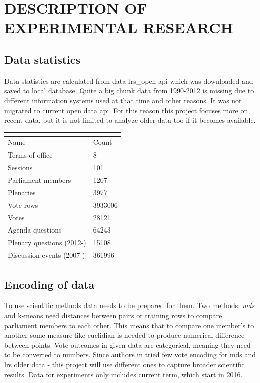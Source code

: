 \documentclass[a4paper,12pt]{article}
\begin{document}
 	
	\clearpage
	
	\section{DESCRIPTION OF EXPERIMENTAL RESEARCH}
	\subsection{Data statistics}
	
	Data statistics are calculated from data \gls{lrs_open} \acrshort{api} which was downloaded and saved to local database. Quite a big chunk data from 1990-2012 is missing due to different information systems used at that time and other reasons. It was not migrated to current open data \acrshort{api}. For this reason this project focuses more on recent data, but it is not limited to analyze older data too if it becomes available.
	
	\noindent
	\begin{center}
		\begin{tabular}{L{5cm} R{3cm}}
			\\ 
			\hline
			Name & Count \\\hline
			Terms of office & 8\\
			Sessions & 101\\
			Parliament members & 1207\\
			Plenaries & 3977\\
			Vote rows & 3933006\\
			Votes & 28121\\
			Agenda questions & 64243\\
			Plenary questions (2012-) & 15108\\
			Discussion events (2007-) & 361996\\
			\hline
		\end{tabular}
		 \label{tab:data_statistics}
	\end{center}
	
	
	\hfill 
	
	\subsection{Encoding of data} 
	
	To use scientific methods data needs to be prepared for them. Two methods: \textit{\acrshort{mds}} and \gls{k-means} need distances between pairs or training rows to compare parliament members to each other. This means that to compare one member's to another some measure like \gls{euclidian} is needed to produce numerical difference between points. Vote outcomes in given data are categorical, meaning they need to be converted to numbers. Since authors in  \cite{vytautas_mick_magistrinis} tried few vote encoding for \acrshort{mds} and \gls{lrs} older data - this project will use different ones to capture broader scientific results. Data for experiments only includes current term, which start in 2016.
	
\end{document}
